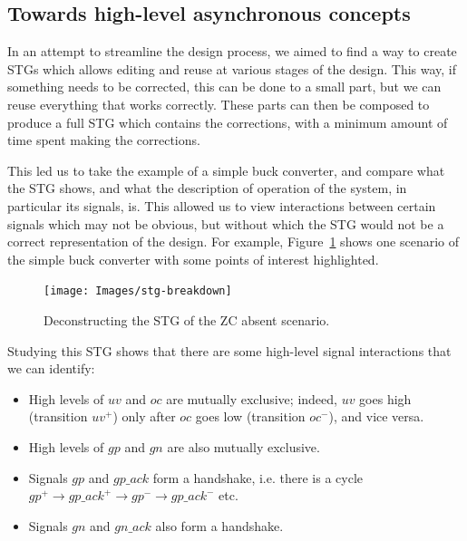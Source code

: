 \documentclass[british, journal]{IEEEtran}
\begin{document}
\vspace{-2mm}
\subsection{Towards high-level asynchronous concepts\label{sub:new-way}}
In an attempt to streamline the design process, we aimed to find a way to
create STGs which allows editing and reuse at various stages of the design.
This way, if something needs to be corrected, this can be done to a small part,
but we can reuse everything that works correctly. These parts can then be
composed to produce a full STG which contains the corrections, with a minimum
amount of time spent making the corrections.

This led us to take the example of a simple buck converter, and compare what
the STG shows, and what the description of operation of the system, in
particular its signals, is. This allowed us to view interactions between
certain signals which may not be obvious, but without which the STG would not
be a correct representation of the design. For example,
Figure~\ref{fig:stg-breakdown} shows one scenario of the simple buck converter
with some points of interest highlighted.

\begin{figure}[t]
\begin{centering}
\texttt{[image: Images/stg-breakdown]}
\par
\protect\caption{\label{fig:stg-breakdown}Deconstructing the STG of the ZC absent scenario.}
\par\end{centering}
\vspace{-4mm}
\end{figure}

Studying this STG shows that there are some high-level signal interactions that
we can identify:
\begin{itemize}
\item High levels of $uv$ and $oc$ are mutually exclusive; indeed, $uv$ goes
high (transition $uv^{+}$) only after $oc$ goes low (transition $oc^{-}$), and vice
versa.
\item High levels of $gp$ and $gn$ are also mutually exclusive.
\item Signals $gp$ and $gp\_ack$ form a handshake, i.e. there is a cycle
$gp^{+} \rightarrow gp\_ack^{+} \rightarrow gp^{-} \rightarrow gp\_ack^{-}$ etc.
\item Signals $gn$ and $gn\_ack$ also form a handshake.
\end{itemize}
\end{document}

